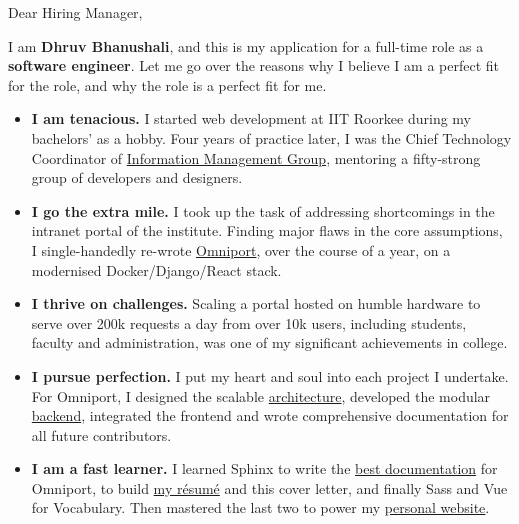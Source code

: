 \formatcoversections
\begin{minipage}{\dimexpr0.5\linewidth-0.5\columnsep\relax}
  
\end{minipage}

\setlength{\parskip}{\baselineskip} %

Dear Hiring Manager,

I am \textbf{Dhruv Bhanushali}, and this is my application for a full-time role
as a \textbf{software engineer}. Let me go over the reasons why I believe I am a
perfect fit for the role, and why the role is a perfect fit for me.


\begin{itemize}[nosep, parsep = 1mm, leftmargin = *]
  \item \textbf{I am tenacious.} I started web development at IIT Roorkee during
  my bachelors' as a hobby. Four years of practice later, I was the Chief
  Technology Coordinator of
  \href{https://https://internet.channeli.in/maintainer_site/}{Information
  Management Group}, mentoring a fifty-strong group of developers and designers.

  \item \textbf{I go the extra mile.} I took up the task of addressing
  shortcomings in the intranet portal of the institute. Finding major flaws in
  the core assumptions, I single-handedly re-wrote
  \href{https://omniport.readthedocs.io}{Omniport}, over the course of a year,
  on a modernised Docker/Django/React stack.

  \item \textbf{I thrive on challenges.} Scaling a portal hosted on humble
  hardware to serve over 200k requests a day from over 10k users, including
  students, faculty and administration, was one of my significant achievements
  in college.

  \item \textbf{I pursue perfection.} I put my heart and soul into each project
  I undertake. For Omniport, I designed the scalable
  \href{https://github.com/IMGIITRoorkee/omniport-docker/}{architecture},
  developed the modular
  \href{https://github.com/IMGIITRoorkee/omniport-backend/}{backend}, integrated
  the frontend and wrote comprehensive documentation for all future
  contributors.

  \item \textbf{I am a fast learner.} I learned Sphinx to write the
  \href{https://github.com/IMGIITRoorkee/omniport-docs/}{best documentation} for
  Omniport, \prettylatex{} to build
  \href{https://github.com/dhruvkb/resume/}{my résumé} and this cover letter,
  and finally Sass and Vue for Vocabulary. Then mastered the last
  two to power my \href{https://dhruvkb.github.io/}{personal website}.


\end{itemize}
